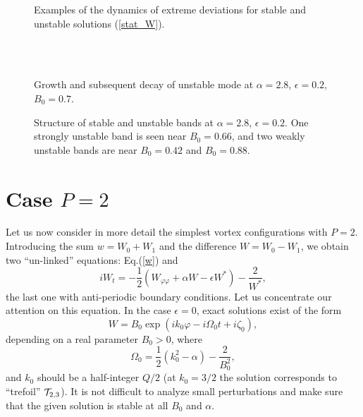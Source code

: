 \documentclass[pra,twocolumn,showpacs]{revtex4}
\begin{document}
\begin{figure}
\begin{center}
\end{center}
\caption{Examples of the dynamics of extreme deviations for stable and unstable solutions (\ref{stat_W}).}
\label{W_max_min_t} 
\end{figure}
\begin{figure}
\begin{center}
\\
\\
\end{center}
\caption{Growth and subsequent decay of unstable mode at  $\alpha=2.8$, $\epsilon=0.2$, $B_0=0.7$.}
\label{W_123} 
\end{figure}
\begin{figure}
\begin{center}
\end{center}
\caption{Structure of stable and unstable bands at $\alpha=2.8$, $\epsilon=0.2$. One strongly unstable 
band is seen near $B_0=0.66$, and two weakly unstable bands are near $B_0=0.42$ and $B_0=0.88$.}
\label{W_MAX_MIN_B0} 
\end{figure}

\section {Case $P=2$}

Let us now consider in more detail the simplest vortex configurations with $P=2$.
Introducing the sum $w=W_0+W_1$ and the difference  $W=W_0-W_1$, we obtain two ``un-linked'' equations:
Eq.(\ref{w}) and
\begin{equation}
iW_t=-\frac{1}{2}(W_{\varphi\varphi}+\alpha W-\epsilon W^*)-\frac{2}{W^*},
\end{equation}
the last one with anti-periodic boundary conditions. Let us concentrate our attention on this equation.
In the case $\epsilon=0$, exact solutions exist of the form
\begin{equation}
W=B_0\exp(ik_0\varphi -i\Omega_0 t +i\zeta_0), 
\end{equation}
depending on a real parameter $B_0>0$, where 
\begin{equation}
\Omega_0=\frac{1}{2}(k_0^2-\alpha)-\frac{2}{B_0^2},
\end{equation}
and $k_0$ should be a half-integer $Q/2$ (at $k_0=3/2$ the solution corresponds to ``trefoil''
${\cal T}_{2,3}$). It is not difficult to analyze small perturbations and make sure that 
the given solution is stable at all $B_0$ and $\alpha$.
\end{document}
